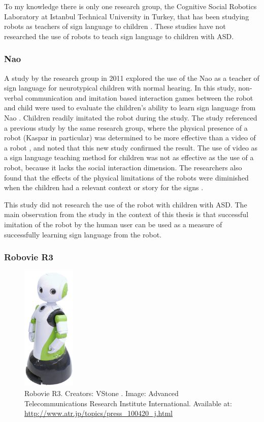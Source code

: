 To my knowledge there is only one research group, the Cognitive Social Robotics Laboratory at Istanbul Technical University in Turkey, that has been studying robots as teachers of sign language to children \cite{CSRLpublications}. These studies have not researched the use of robots to teach sign language to children with ASD.



\subsubsection{Nao}

A study by the research group in 2011 explored the use of the Nao as a teacher of sign language for neurotypical children with normal hearing. In this study, non-verbal communication and imitation based interaction games between the robot and child were used to evaluate the children's ability to learn sign language from Nao \cite{taleofarobot}. Children readily imitated the robot during the study. The study referenced a previous study by the same research group, where the physical presence of a robot (Kaspar in particular) was determined to be more effective than a video of a robot \cite{kose2009effects}, and noted that this new study confirmed the result. The use of video as a sign language teaching method for children was not as effective as the use of a robot, because it lacks the social interaction dimension. The researchers also found that the effects of the physical limitations of the robots were diminished when the children had a relevant context or story for the signs \cite{taleofarobot}. 

This study did not research the use of the robot with children with ASD. The main observation from the study in the context of this thesis is that successful imitation of the robot by the human user can be used as a measure of successfully learning sign language from the robot.


\subsubsection{Robovie R3}

\begin{figure}
\centering
{}
  \includegraphics[width=1in]{images/robovieR3.png}
  \caption{Robovie R3. Creators: VStone \cite{Vstone}. Image: Advanced Telecommunications Research Institute International. Available at: \url{http://www.atr.jp/topics/press_100420_j.html}}
  \label{fig:robovie}
\end{figure}

